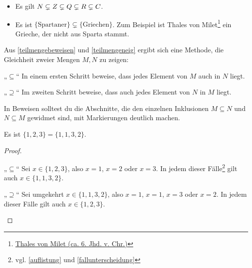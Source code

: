 \begin{bsp} \quad
    \begin{itemize}
        \item Es gilt $\relax N\subsetneq\relax Z\subsetneq\relax Q\subsetneq\relax R\subsetneq\relax C$.
        \item Es ist $\{\text{Spartaner}\}\subsetneq \{\text{Griechen}\}$. Zum Beispiel ist Thales von Milet\footnote{\href{https://de.wikipedia.org/wiki/Thales}{Thales von Milet (ca. 6. Jhd. v. Chr.)}} ein Grieche, der nicht aus Sparta stammt.
    \end{itemize}
\end{bsp}


\begin{bem} \label{mengengleichbeweis}
    Aus \cref{teilmengebeweisen} und \cref{teilmengeneig} ergibt sich eine Methode, die Gleichheit zweier Mengen $M,N$ zu zeigen:
    \begin{labeling}
        \item[„$\subseteq$“] In einem ersten Schritt beweise, dass jedes Element von $M$ auch in $N$ liegt.
        \item[„$\supseteq$“] Im zweiten Schritt beweise, dass auch jedes Element von $N$ in $M$ liegt.
    \end{labeling}
    In Beweisen solltest du die Abschnitte, die den einzelnen Inklusionen $M\subseteq N$ und $N\subseteq M$ gewidmet sind, mit Markierungen deutlich machen.
\end{bem}


\begin{bsp} \label{bsp:mengengleichbeweis}
    Es ist $\{1,2,3\}=\{1,1,3,2\}$.
\end{bsp}
\begin{proof}
    \begin{labeling}
        \item[„$\subseteq$“] Sei $x\in\{1,2,3\}$, also $x=1$, $x=2$ oder $x=3$. In jedem dieser Fälle\footnote{vgl. \cref{auflistung} und \cref{fallunterscheidung}} gilt auch $x\in\{1,1,3,2\}$.
        \item[„$\supseteq$“] Sei umgekehrt $x\in\{1,1,3,2\}$,  also $x=1$, $x=1$, $x=3$ oder $x=2$. In jedem dieser Fälle gilt auch $x\in\{1,2,3\}$. \qedhere
    \end{labeling}
\end{proof}


